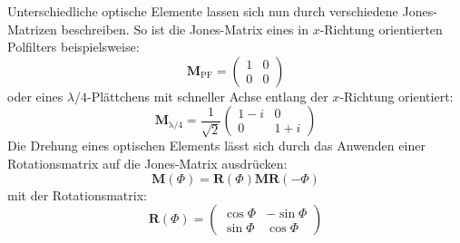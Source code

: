 \documentclass[titlepage,  ngerman]{article}
\begin{document}
	Unterschiedliche optische Elemente lassen sich nun durch verschiedene Jones-Matrizen beschreiben. So ist die Jones-Matrix eines in $x$-Richtung orientierten Polfilters beispielsweise:
	\begin{equation}
		\boldsymbol{M}_{\mathrm{PF}} = \begin{pmatrix}
			1 & 0 \\
			0 & 0
		\end{pmatrix}
	\end{equation}
	oder eines $\lambda / 4$-Plättchens mit schneller Achse entlang der $x$-Richtung orientiert:	
	\begin{equation}
		\boldsymbol{M}_{\mathrm{\lambda / 4}} = \dfrac{1}{\sqrt{2}}\begin{pmatrix}
			1-i & 0 \\
			0 & 1+i
		\end{pmatrix}
	\end{equation}
	Die Drehung eines optischen Elements lässt sich durch das Anwenden einer Rotationsmatrix auf die Jones-Matrix ausdrücken:
	\begin{equation}
		\boldsymbol{M}(\Phi) = \boldsymbol{R}(\Phi)\boldsymbol{M}\boldsymbol{R}(-\Phi)
	\end{equation}
	mit der Rotationsmatrix:
	\begin{equation}
		\boldsymbol{R}(\Phi) = \begin{pmatrix}
			\cos\Phi & - \sin\Phi \\
			\sin\Phi & \cos\Phi
		\end{pmatrix}
	\end{equation}
\end{document}
